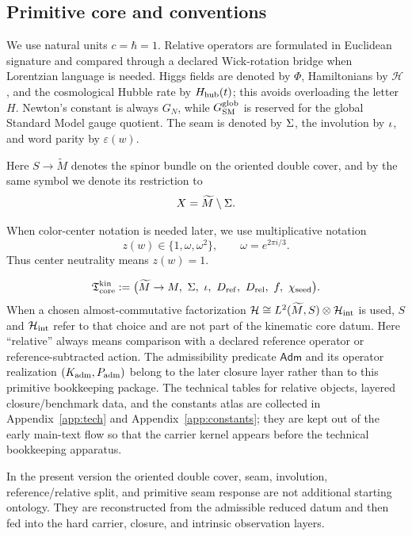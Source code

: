 \subsection{Primitive core and conventions}

We use natural units $c=\hbar=1$. Relative operators are formulated in Euclidean signature and compared through a declared Wick-rotation bridge when Lorentzian language is needed. Higgs fields are denoted by $\Phi$, Hamiltonians by $\mathcal H$, and the cosmological Hubble rate by $H_{\mathrm{hub}}(t)$; this avoids overloading the letter $H$. Newton's constant is always $G_N$, while $G_{\mathrm{SM}}^{\mathrm{glob}}$ is reserved for the global Standard Model gauge quotient. The seam is denoted by $\Sigma$, the involution by $\iota$, and word parity by $\varepsilon(w)$.

Here $S\to \widetilde M$ denotes the spinor bundle on the oriented double cover, and by the same symbol we denote its restriction to
\[
X=\widetilde M\setminus\Sigma.
\]

When color-center notation is needed later, we use multiplicative notation
\[
z(w)\in\{1,\omega,\omega^2\},
\qquad
\omega=e^{2\pi i/3}.
\]
Thus center neutrality means $z(w)=1$.

\[
\Tcore^{\mathrm{kin}}
:=
\bigl(
\widetilde M\to M,\ \Seam,\ \inv,\ D_{\mathrm{ref}},\ D_{\mathrm{rel}},\ f,\ \chiseed
\bigr).
\]
When a chosen almost-commutative factorization
$\mathcal H\cong L^2(\widetilde M,S)\otimes\mathcal H_{\mathrm{int}}$ is used, $S$ and $\mathcal H_{\mathrm{int}}$ refer to that
choice and are not part of the kinematic core datum.
Here \enquote{relative} always means comparison with a declared reference operator or reference-subtracted action. The admissibility predicate $\mathsf{Adm}$ and its operator realization $(K_{\mathrm{adm}},P_{\mathrm{adm}})$ belong to the later closure layer rather than to this primitive bookkeeping package. The technical tables for relative objects, layered closure/benchmark data, and the constants atlas are collected in Appendix~\ref{app:tech} and Appendix~\ref{app:constants}; they are kept out of the early main-text flow so that the carrier kernel appears before the technical bookkeeping apparatus.

\begin{remark}
In the present version the oriented double cover, seam, involution, reference/relative
split, and primitive seam response are not additional starting ontology. They are reconstructed
from the admissible reduced datum and then fed into the hard carrier, closure, and intrinsic
observation layers.
\end{remark}


